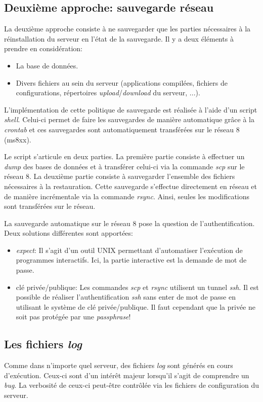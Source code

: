 \documentclass[a4paper, 12pt]{report}
\begin{document}
\subsection{Deuxième approche: sauvegarde réseau}
La deuxième approche consiste à ne sauvegarder que les parties nécessaires à la réinstallation du serveur en l'état de la sauvegarde. Il y a deux éléments à prendre en considération:
\begin{itemize}
\item La base de données.
\item Divers fichiers au sein du serveur (applications compilées, fichiers de configurations, répertoires \textit{upload}/\textit{download} du serveur, ...).
\end{itemize} 

L'implémentation de cette politique de sauvegarde est réalisée à l'aide d'un script \textit{shell}. Celui-ci permet de faire les sauvegardes de manière automatique grâce à la \textit{crontab} et ces sauvegardes sont automatiquement transférées sur le réseau 8 (ms8xx). 

Le script s'articule en deux parties. La première partie consiste à effectuer un \textit{dump} des bases de données et à transférer celui-ci via la commande \textit{scp} sur le réseau 8. La deuxième partie consiste à sauvegarder l'ensemble des fichiers nécessaires à la restauration. Cette sauvegarde s'effectue directement en réseau et de manière incrémentale via la commande \textit{rsync}. Ainsi, seules les modifications sont transférées sur le réseau. %

La sauvegarde automatique sur le réseau 8 pose la question de l'authentification. Deux solutions différentes sont apportées:
\begin{itemize}
\item \textit{expect}: Il s'agit d'un outil UNIX permettant d'automatiser l'exécution de programmes interactifs. Ici, la partie interactive est la demande de mot de passe.
\item clé privée/publique: Les commandes \textit{scp} et \textit{rsync} utilisent un tunnel \textit{ssh}. Il est possible de réaliser l'authentification \textit{ssh} sans enter de mot de passe en utilisant le système de clé privée/publique. Il faut cependant que la privée ne soit pas protégée par une \textit{passphrase}! 
\end{itemize}

\subsection{Les fichiers \textit{log}}
Comme dans n'importe quel serveur, des fichiers \textit{log} sont générés en cours d'exécution. Ceux-ci sont d'un intérêt majeur lorsqu'il s'agit de comprendre un \textit{bug}. La verbosité de ceux-ci peut-être contrôlée via les fichiers de configuration du serveur. 
\end{document}
